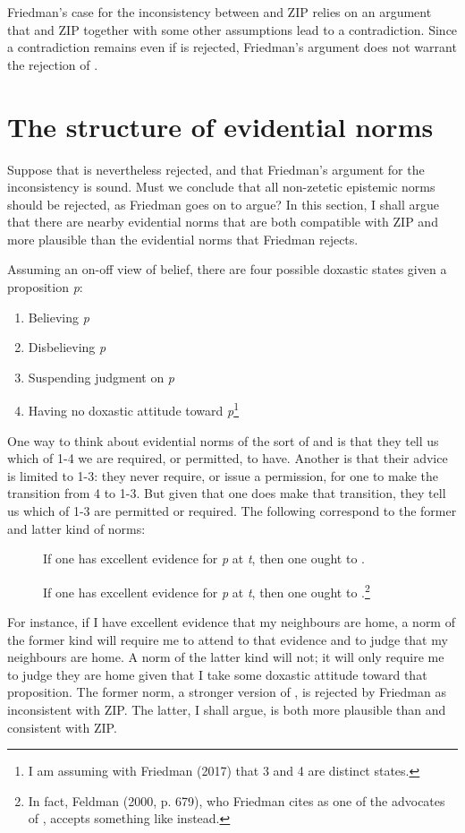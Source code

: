 \documentclass[12pt]{article}
\begin{document}
Friedman's case for the inconsistency between \ep{} and ZIP relies on an argument that \ep{} and ZIP together with some other assumptions lead to a contradiction. Since a contradiction remains even if \ep{} is rejected, Friedman's argument does not warrant the rejection of \ep{}.

\section{The structure of evidential norms}

Suppose that \ep{} is nevertheless rejected, and that Friedman's argument for the inconsistency is sound. Must we conclude that all non-zetetic epistemic norms should be rejected, as Friedman goes on to argue? In this section, I shall argue that there are nearby evidential norms that are both compatible with ZIP and more plausible than the evidential norms that Friedman rejects.

Assuming an on-off view of belief, there are four possible doxastic states given a proposition \textit{p}:

\begin{enumerate}
    \item Believing \textit{p}
    \item Disbelieving \textit{p}
    \item Suspending judgment on \textit{p}
    \item Having no doxastic attitude toward \textit{p}\footnote{I am assuming with Friedman (2017) that 3 and 4 are distinct states.}
\end{enumerate}
%
One way to think about evidential norms of the sort of \ep{} and \eo{} is that they tell us which of 1-4 we are required, or permitted, to have. Another is that their advice is limited to 1-3: they never require, or issue a permission, for one to make the transition from 4 to 1-3. But given that one does make that transition, they tell us which of 1-3 are permitted or required. The following correspond to the former and latter kind of norms:

\begin{description}
    \item[\eo] If one has excellent evidence for \textit{p} at \textit{t}, then one ought to \jud{}.
    \item[\eo*] If one has excellent evidence for \textit{p} at \textit{t}, then one ought to \judif{}.\footnote{In fact, Feldman (2000, p. 679), who Friedman cites as one of the advocates of \eo{}, accepts something like \eo*{} instead.}
\end{description}
%
For instance, if I have excellent evidence that my neighbours are home, a norm of the former kind will require me to attend to that evidence and to judge that my neighbours are home. A norm of the latter kind will not; it will only require me to judge they are home given that I take some doxastic attitude toward that proposition. The former norm, a stronger version of \ep{}, is rejected by Friedman as inconsistent with ZIP. The latter, I shall argue, is both more plausible than \eo{} and consistent with ZIP.
\end{document}
